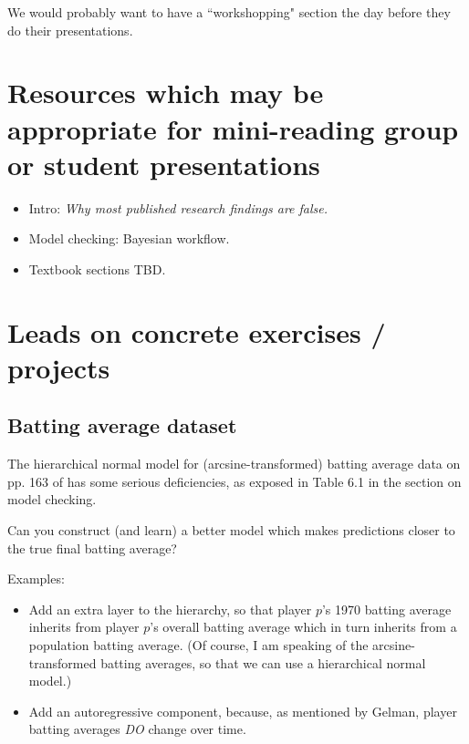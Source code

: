 \documentclass{article} %
\begin{document}
We would probably want to have a ``workshopping" section the day before they do their presentations.


{}



\appendix

\section{Resources which may be appropriate for mini-reading group or student presentations}

\begin{itemize}
\item Intro: \textit{Why most published research findings are false. } \cite{ioannidis2005most}
\item Model checking: Bayesian workflow.
\item Textbook sections TBD. 
\end{itemize}

\section{Leads on concrete exercises / projects}

\subsection{Batting average dataset}

The hierarchical normal model for (arcsine-transformed) batting average data on pp.  163 of \cite{gelman2013bayesian} has some serious deficiencies,  as exposed in Table 6.1 in the section on model checking.    

Can you construct (and learn) a better model which makes predictions closer to the true final batting average?
 
Examples:
\begin{itemize}
\item Add an extra layer to the hierarchy,  so that player $p$'s 1970 batting average inherits from player $p$'s overall batting average which in turn inherits from a population batting average.  (Of course,  I am speaking of the arcsine-transformed batting averages,  so that we can use a hierarchical normal model.)
\item Add an autoregressive component, because,  as mentioned by Gelman,  player batting averages \textit{DO} change over time. 
\end{itemize}
\end{document}

